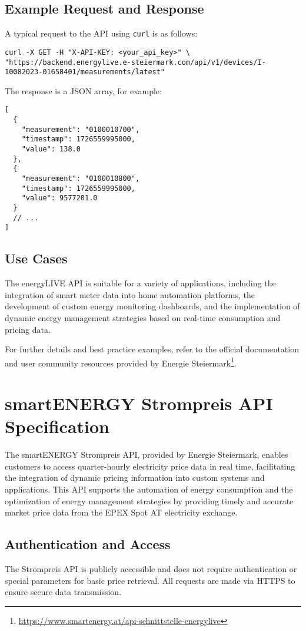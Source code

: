 \subsection{Example Request and Response}
A typical request to the API using \texttt{curl} is as follows:
\begin{lstlisting}
curl -X GET -H "X-API-KEY: <your_api_key>" \
"https://backend.energylive.e-steiermark.com/api/v1/devices/I-10082023-01658401/measurements/latest"
\end{lstlisting}

The response is a JSON array, for example:
\begin{lstlisting}
[
  {
    "measurement": "0100010700",
    "timestamp": 1726559995000,
    "value": 138.0
  },
  {
    "measurement": "0100010800",
    "timestamp": 1726559995000,
    "value": 9577201.0
  }
  // ...
]
\end{lstlisting}

\subsection{Use Cases}
The energyLIVE API is suitable for a variety of applications, including the integration of smart meter data into home automation platforms, the development of custom energy monitoring dashboards, and the implementation of dynamic energy management strategies based on real-time consumption and pricing data.

For further details and best practice examples, refer to the official documentation and user community resources provided by Energie Steiermark\footnote{\url{https://www.smartenergy.at/api-schnittstelle-energylive}}.

\newpage
\section{smartENERGY Strompreis API Specification}
\label{appendix:strompreis-api}

The smartENERGY Strompreis API, provided by Energie Steiermark, enables customers to access quarter-hourly electricity price data in real time, facilitating the integration of dynamic pricing information into custom systems and applications. This API supports the automation of energy consumption and the optimization of energy management strategies by providing timely and accurate market price data from the EPEX Spot AT electricity exchange.

\subsection{Authentication and Access}
The Strompreis API is publicly accessible and does not require authentication or special parameters for basic price retrieval. All requests are made via HTTPS to ensure secure data transmission.


